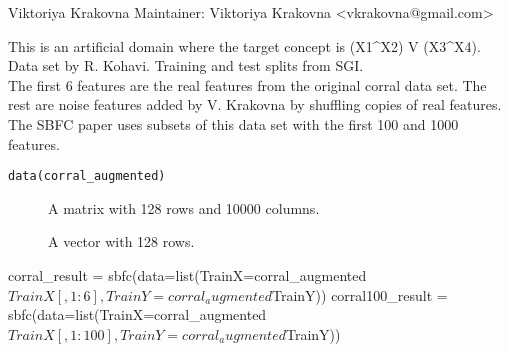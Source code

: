 \documentclass[a4paper]{book}
\begin{document}
%
\begin{Author}\relax
Viktoriya Krakovna
Maintainer: Viktoriya Krakovna <vkrakovna@gmail.com>
\end{Author}
%
\begin{Description}\relax
This is an artificial domain where the target concept is (X1\textasciicircum{}X2) V (X3\textasciicircum{}X4). \\{}
Data set by R. Kohavi. Training and test splits from SGI. \\{}
The first 6 features are the real features from the original corral data set.
The rest are noise features added by V. Krakovna by shuffling copies of real features.\\{}
The SBFC paper uses subsets of this data set with the first 100 and 1000 features.
\end{Description}
%
\begin{Usage}
\begin{verbatim}
data(corral_augmented)
\end{verbatim}
\end{Usage}
%
\begin{Format}
\begin{description}

\item[] A matrix with 128 rows and 10000 columns.
\item[] A vector with 128 rows.

\end{description}
\end{Format}
%
\begin{References}\relax
{}

\end{References}
%
\begin{Examples}
\begin{ExampleCode}
corral_result = sbfc(data=list(TrainX=corral_augmented$TrainX[,1:6],
                                         TrainY = corral_augmented$TrainY))
corral100_result = sbfc(data=list(TrainX=corral_augmented$TrainX[,1:100], 
                                  TrainY = corral_augmented$TrainY))
\end{ExampleCode}
\end{Examples}
\end{document}
